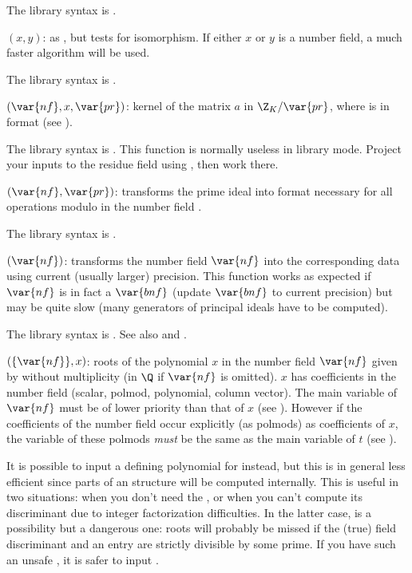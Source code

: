 The library syntax is .

$(x,y)$: \label{se:nfisisom}as , but tests for isomorphism. If either $x$ or $y$ is a
number field, a much faster algorithm will be used.

The library syntax is .

$(\var{nf},x,\var{pr})$: \label{se:nfkermodpr}kernel of the matrix $a$ in $\Z_K/\var{pr}$, where  is in
 format (see ).

The library syntax is .
This function is normally useless in library mode. Project your
inputs to the residue field using , then work there.

$(\var{nf},\var{pr})$: \label{se:nfmodprinit}transforms the prime ideal  into  format necessary
for all operations modulo  in the number field .

The library syntax is .

$(\var{nf})$: \label{se:nfnewprec}transforms the number field $\var{nf}$
into the corresponding data using current (usually larger) precision. This
function works as expected if $\var{nf}$ is in fact a $\var{bnf}$ (update
$\var{bnf}$ to current precision) but may be quite slow (many generators of
principal ideals have to be computed).

The library syntax is .
See also 
and .

$(\{\var{nf}\},x)$: \label{se:nfroots}roots of the polynomial $x$ in the
number field $\var{nf}$ given by  without multiplicity (in $\Q$
if $\var{nf}$ is omitted). $x$ has coefficients in the number field (scalar,
polmod, polynomial, column vector). The main variable of $\var{nf}$ must be
of lower priority than that of $x$ (see ). However if the
coefficients of the number field occur explicitly (as polmods) as
coefficients of $x$, the variable of these polmods \emph{must} be the same as
the main variable of $t$ (see ).

It is possible to input a defining polynomial for 
instead, but this is in general less efficient since parts of an 
structure will be computed internally. This is useful in two situations: when
you don't need the , or when you can't compute its discriminant due
to integer factorization difficulties. In the latter case,  is
a possibility but a dangerous one: roots will probably be missed if the
(true) field discriminant and an  entry are strictly divisible
by some prime. If you have such an unsafe , it is safer to input
.

